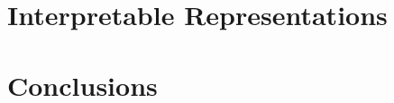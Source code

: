 







\section{Interpretable Representations}\label{ch2:Interpretability}


\section{Conclusions}

